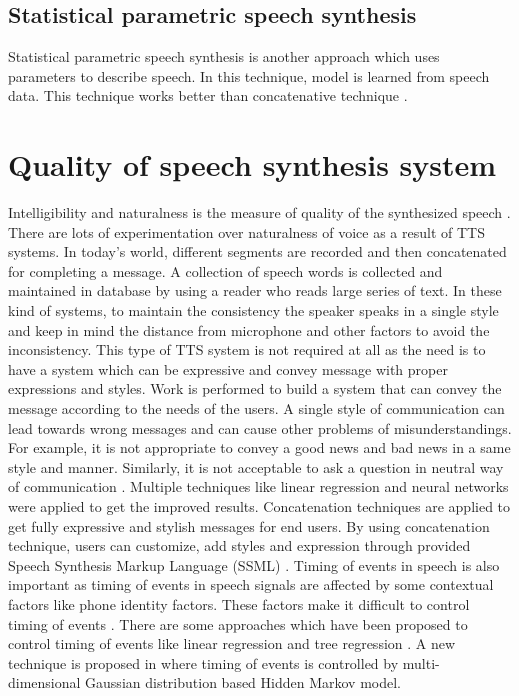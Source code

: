 \subsection{Statistical parametric speech synthesis}
Statistical parametric speech synthesis is another approach which uses parameters to describe
speech. In this technique, model is learned from speech data. This technique works better than
concatenative technique \cite{merritt2013investigating}. 

\section{Quality of speech synthesis system}
Intelligibility and naturalness is the measure of quality of the synthesized speech \cite{swetha2013text}. 
There are lots of experimentation over naturalness of voice as a result of TTS
systems. In today’s world, different segments are recorded and then concatenated for completing a
message. A collection of speech words is collected and maintained in database by using a reader
who reads large series of text. In these kind of systems, to maintain the consistency the speaker
speaks in a single style and keep in mind the distance from microphone and other factors to avoid
the inconsistency. This type of TTS system is not required at all as the need is to have a system
which can be expressive and convey message with proper expressions and styles. Work is
performed to build a system that can convey the message according to the needs of the users. A
single style of communication can lead towards wrong messages and can cause other problems of
misunderstandings. For example, it is not appropriate to convey a good news and bad news in a same
style and manner. Similarly, it is not acceptable to ask a question in neutral way of communication \cite{eide2004corpus}.
Multiple techniques like linear regression and neural networks were applied to get the improved results. Concatenation techniques are applied to get fully
expressive and stylish messages for end users. By using concatenation technique, users can
customize, add styles and expression through provided Speech Synthesis Markup Language (SSML) \cite{eide2004corpus}. 
Timing of events in speech is also important as timing of events in
speech signals are affected by some contextual factors like phone identity factors. These factors
make it difficult to control timing of events \cite{tokuda2000speech}. There are some approaches which have been proposed
to control timing of events like linear regression \cite{kaiki1992linguistic} and tree regression \cite{riley1992tree}. 
A new technique is proposed in \cite{tokuda2000speech} where timing of events is
controlled by multi-dimensional Gaussian distribution based Hidden Markov model.

